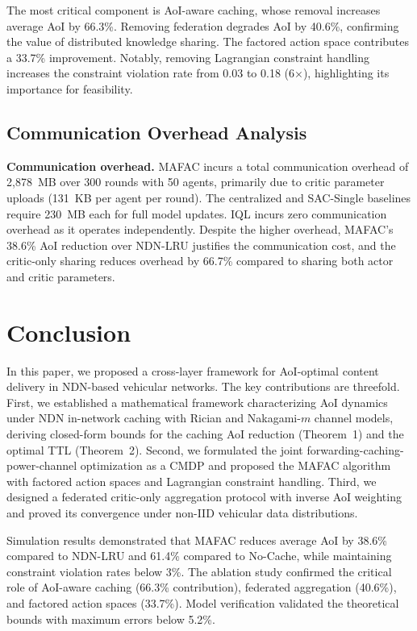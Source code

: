\documentclass[journal]{IEEEtran}
\begin{document}
The most critical component is AoI-aware caching, whose removal increases average AoI by 66.3\%. Removing federation degrades AoI by 40.6\%, confirming the value of distributed knowledge sharing. The factored action space contributes a 33.7\% improvement. Notably, removing Lagrangian constraint handling increases the constraint violation rate from 0.03 to 0.18 (6$\times$), highlighting its importance for feasibility.

\subsection{Communication Overhead Analysis} \label{sec.s4}

\textbf{Communication overhead.} MAFAC incurs a total communication overhead of 2,878~MB over 300 rounds with 50 agents, primarily due to critic parameter uploads (131~KB per agent per round). The centralized and SAC-Single baselines require 230~MB each for full model updates. IQL incurs zero communication overhead as it operates independently. Despite the higher overhead, MAFAC's 38.6\% AoI reduction over NDN-LRU justifies the communication cost, and the critic-only sharing reduces overhead by 66.7\% compared to sharing both actor and critic parameters.

\section{Conclusion} \label{sec.c}

In this paper, we proposed a cross-layer framework for AoI-optimal content delivery in NDN-based vehicular networks. The key contributions are threefold. First, we established a mathematical framework characterizing AoI dynamics under NDN in-network caching with Rician and Nakagami-$m$ channel models, deriving closed-form bounds for the caching AoI reduction (Theorem~1) and the optimal TTL (Theorem~2). Second, we formulated the joint forwarding-caching-power-channel optimization as a CMDP and proposed the MAFAC algorithm with factored action spaces and Lagrangian constraint handling. Third, we designed a federated critic-only aggregation protocol with inverse AoI weighting and proved its convergence under non-IID vehicular data distributions.

Simulation results demonstrated that MAFAC reduces average AoI by 38.6\% compared to NDN-LRU and 61.4\% compared to No-Cache, while maintaining constraint violation rates below 3\%. The ablation study confirmed the critical role of AoI-aware caching (66.3\% contribution), federated aggregation (40.6\%), and factored action spaces (33.7\%). Model verification validated the theoretical bounds with maximum errors below 5.2\%.
\end{document}
